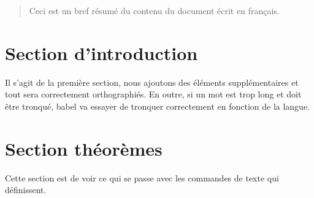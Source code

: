 \documentclass[french]{article}
\begin{document}
\tableofcontents

\vspace{2cm} %

\begin{abstract}
Ceci est un bref résumé du contenu du document écrit en français.
\end{abstract}

\section{Section d'introduction}
Il s'agit de la première section, nous ajoutons des éléments supplémentaires et tout sera correctement orthographiés. En outre, si un mot est trop long et doit être tronqué, babel va essayer de tronquer correctement en fonction de la langue.

\section{Section théorèmes}
Cette section est de voir ce qui se passe avec les commandes de texte qui définissent.
\end{document}
